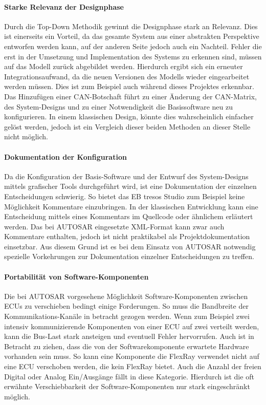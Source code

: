 \documentclass[
  a4paper,					    %
  twoside,
  DIV=calc,     				%
  bibliography=totoc,
  cleardoublepage=empty,
  ngerman,     					%
  final       					%
]{scrbook}
\begin{document}
\paragraph{Starke Relevanz der Designphase}
Durch die Top-Down Methodik gewinnt die Designphase stark an Relevanz. Dies ist einerseits ein Vorteil, da das gesamte System aus einer abstrakten Perspektive entworfen werden kann, auf der anderen Seite jedoch auch ein Nachteil. Fehler die erst in der Umsetzung und Implementation des Systems zu erkennen sind, müssen auf das Modell zurück abgebildet werden. Hierdurch ergibt sich ein erneuter Integrationsaufwand, da die neuen Versionen des Modells wieder eingearbeitet werden müssen. Dies ist zum Beispiel auch während dieses Projektes erkennbar. Das Hinzufügen einer CAN-Botschaft führt zu einer Änderung der CAN-Matrix, des System-Designs und zu einer Notwendigkeit die Basissoftware neu zu konfigurieren. In einem klassischen Design, könnte dies wahrscheinlich einfacher gelöst werden, jedoch ist ein Vergleich dieser beiden Methoden an dieser Stelle nicht möglich.

\paragraph{Dokumentation der Konfiguration}
Da die Konfiguration der Basis-Software und der Entwurf des System-Designs mittels grafischer Tools durchgeführt wird, ist eine Dokumentation der einzelnen Entscheidungen schwierig.\cite[Seite 182 f.]{SE_Autosar} So bietet das EB tresos Studio zum Beispiel keine Möglichkeit Kommentare einzubringen. In der klassischen Entwicklung kann eine Entscheidung mittels eines Kommentars im Quellcode oder ähnlichem erläutert werden. Das bei AUTOSAR eingesetzte XML-Format kann zwar auch Kommentare enthalten, jedoch ist nicht praktikabel als Projektdokumentation einsetzbar. Aus diesem Grund ist es bei dem Einsatz von AUTOSAR notwendig spezielle Vorkehrungen zur Dokumentation einzelner Entscheidungen zu treffen.

\paragraph{Portabilität von Software-Komponenten}
Die bei AUTOSAR vorgesehene Möglichkeit Software-Komponenten zwischen ECUs zu verschieben bedingt einige Forderungen. So muss die Bandbreite der Kommunikations-Kanäle in betracht gezogen werden. Wenn zum Beispiel zwei intensiv kommunizierende Komponenten von einer ECU auf zwei verteilt werden, kann die Bus-Last stark ansteigen und eventuell Fehler hervorrufen. Auch ist in Betracht zu ziehen, dass die von der Softwarekomponente erwartete Hardware vorhanden sein muss. So kann eine Komponente die FlexRay verwendet nicht auf eine ECU verschoben werden, die kein FlexRay bietet. Auch die Anzahl der freien Digital oder Analog Ein/Ausgänge fällt in diese Kategorie. Hierdurch ist die oft erwähnte Verschiebbarkeit der Software-Komponenten nur stark eingeschränkt möglich.
\end{document}
